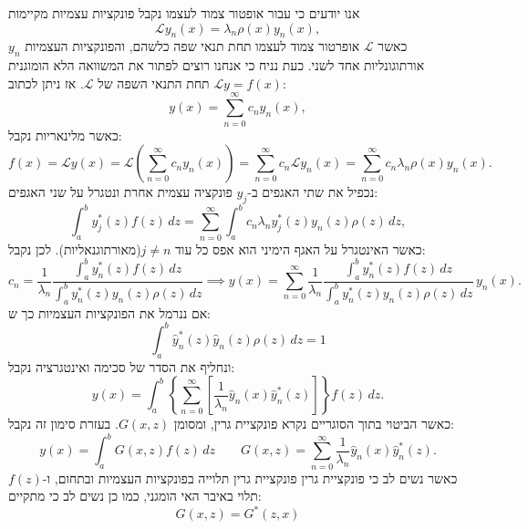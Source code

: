 \documentclass{tstextbook}
\begin{document}
אנו יודעים כי עבור אופטור צמוד לעצמו נקבל פונקציות עצמיות מקיימות $${\mathcal L}y_{n}(x)=\lambda_{n}\rho(x)y_{n}(x),$$
כאשר \(\mathcal{L}\) אופרטור צמוד לעצמו תחת תנאי שפה כלשהם, והפונקציות העצמיות \(y_{n}\) אורתוגונליות אחד לשני. כעת נניח כי אנחנו רוצים לפתור את המשוואה הלא הומוגנית \(\mathcal{L}y=f(x)\) תחת התנאי השפה של \(\mathcal{L}\). אז ניתן לכתוב:
$$y(x)=\sum_{n=0}^{\infty}c_{n}y_{n}(x),$$
כאשר מלינאריות נקבל:
$$f(x)={\mathcal{L}}y(x)={\mathcal{L}}\left(\sum_{n=0}^{\infty}c_{n}y_{n}(x)\right)=\sum_{n=0}^{\infty}c_{n}{\mathcal{L}}y_{n}(x)=\sum_{n=0}^{\infty}c_{n}\lambda_{n}\rho(x)y_{n}(x).$$
נכפיל את שתי האגפים ב-\(y_{j}\) פונקציה עצמית אחרת ונטגרל על שני האגפים:
$$\int_{a}^{b}y_{j}^{\ast}(z)f(z)\,d z=\sum_{n=0}^{\infty}\int_{a}^{b}c_{n}\lambda_{n}y_{j}^{\ast}(z)y_{n}(z)\rho(z)\,d z,$$
כאשר האינטגרל על האגף הימיני הוא אפס כל עוד \(j\neq n\)(מאורתוגנאליות). לכן נקבל:
$$c_{n}=\frac{1}{\lambda_{n}}\frac{\int_{a}^{b}y_{n}^{*}(z)f(z)\,d z}{\int_{a}^{b}y_{n}^{*}(z)y_{n}(z)\rho(z)\,d z}\implies y(x)=\sum_{n=0}^{\infty}\frac{1}{\lambda_{n}}\frac{\int_{a}^{b}y_{n}^{\ast}(z)f(z)\,d z}{\int_{a}^{b}y_{n}^{\ast}(z)y_{n}(z)\rho(z)\,d z}\,y_{n}(x).$$
אם ננרמל את הפונקציות העצמיות כך ש:
$$\int_{a}^{b}{\hat{y}}_{n}^{*}(z){\hat{y}}_{n}(z)\rho(z)\,d z=1$$
ונחליף את הסדר של סכימה ואינטגרציה נקבל:
$$y(x)=\int_{a}^{b}\left\{\sum_{n=0}^{\infty}\left[{\frac{1}{\lambda_{n}}}{\hat{y}}_{n}(x){\hat{y}}_{n}^{*}(z)\right]\right\}f(z)\,d z.$$
כאשר הביטוי בתוך הסוגריים נקרא פונקציית גרין, ומסומן \(G(x,z)\). בעזרת סימון זה נקבל:
$$y(x)=\int_{a}^{b}G(x,z)f(z)\,d z \qquad  G(x,z)=\sum_{n=0}^{\infty}\frac{1}{\lambda_{n}}\hat{y}_{n}(x)\hat{y}_{n}^{*}(z).$$
כאשר נשים לב כי פונקציית גרין פונקציית גרין תלוייה בפונקציות העצמיות ובתחום, ו-\(f(z)\) תלוי באיבר האי הומגני, כמו כן נשים לב כי מתקיים:
$$G(x,z)=G^{*}(z,x)$$
\end{document}
